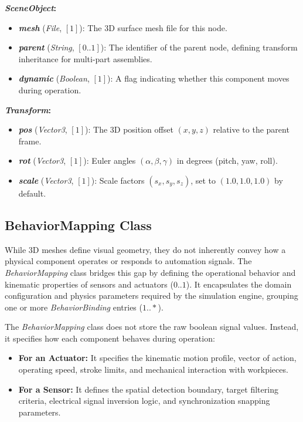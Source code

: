 \textbf{\textit{SceneObject}:}
\begin{itemize}
    \item \textbf{\textit{mesh}} (\textit{File}, $[1]$): The 3D surface mesh file for this node.
    \item \textbf{\textit{parent}} (\textit{String}, $[0..1]$): The identifier of the parent node, defining transform inheritance for multi-part assemblies.
    \item \textbf{\textit{dynamic}} (\textit{Boolean}, $[1]$): A flag indicating whether this component moves during operation.
\end{itemize}

\textbf{\textit{Transform}:}
\begin{itemize}
    \item \textbf{\textit{pos}} (\textit{Vector3}, $[1]$): The 3D position offset $(x, y, z)$ relative to the parent frame.
    \item \textbf{\textit{rot}} (\textit{Vector3}, $[1]$): Euler angles $(\alpha, \beta, \gamma)$ in degrees (pitch, yaw, roll).
    \item \textbf{\textit{scale}} (\textit{Vector3}, $[1]$): Scale factors $(s_x, s_y, s_z)$, set to $(1.0, 1.0, 1.0)$ by default.
\end{itemize}

\subsection{BehaviorMapping Class}
\label{sec:model_behavior_mapping}

While 3D meshes define visual geometry, they do not inherently convey how a physical component operates or responds to automation signals. The \textit{BehaviorMapping} class bridges this gap by defining the operational behavior and kinematic properties of sensors and actuators ($0..1$). It encapsulates the domain configuration and physics parameters required by the simulation engine, grouping one or more \textit{BehaviorBinding} entries ($1..*$). 

The \textit{BehaviorMapping} class does not store the raw boolean signal values. Instead, it specifies how each component behaves during operation:
\begin{itemize}
    \item \textbf{For an Actuator:} It specifies the kinematic motion profile, vector of action, operating speed, stroke limits, and mechanical interaction with workpieces.
    \item \textbf{For a Sensor:} It defines the spatial detection boundary, target filtering criteria, electrical signal inversion logic, and synchronization snapping parameters.
\end{itemize}

